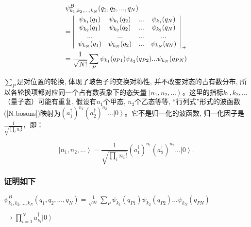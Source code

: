 \begin{equation}\label{N bosons}
\begin{gathered}
\psi_{k_1,k_2,...,k_N}^B(q_1,q_2,...,q_N) \hfill \\
= \left|
{\begin{array}{*{20}c}
   {\psi _{k_1 } (q_1 )} & {\psi _{k_1 } (q_2 )} & {...} & {\psi _{k_1 } (q_N )}  \\
   {\psi _{k_2 } (q_1 )} & {\psi _{k_2 } (q_2 )} & {...} & {\psi _{k_2 } (q_N )}  \\
   {...} & {...} & {...} & {...}  \\
   {\psi _{k_N } (q_1 )} & {\psi _{k_N } (q_2 )} & {...} & {\psi _{k_N } (q_N )}  \\
 \end{array} } \right|_ + \hfill \\
= \frac{1}{\sqrt {N!}} \sum\limits_P \psi_{k_1}(q_{P1})
\psi_{k_2}(q_{P2})...\psi_{k_N}(q_{PN}) \hfill \\
\end{gathered}
\end{equation}


$\sum\limits_P$是对位置的轮换, 体现了玻色子的交换对称性,
并不改变对态的占有数分布,
所以各轮换项都对应同一个占有数表象下的态矢量 $\left|n_1,n_2,...
\right\rangle$。这里的指标$k_1,k_2,...$（量子态）可能有重复,
假设有$n_1$个甲态, $n_2$个乙态等等, “行列式”形式的波函数(\ref{N
bosons})映射为$(a_1^{\dagger})^{n_1} (a_2^{\dagger})^{n_2}... \left|
0 \right\rangle$。它不是归一化的波函数, 归一化因子是$\frac{1}{{\sqrt
{\prod\limits_i {n_i !} } }}$，即：

\begin{equation}\label{Normalized bosons occ rep}
\left| {n_1 ,n_2 ,...} \right\rangle = \frac{1}{{\sqrt {
\prod\limits_i {n_i !} } }} (a_1^{\dagger})^{n_1}
(a_2^{\dagger})^{n_2} ... \left| 0 \right\rangle .
\end{equation}



\subsubsection*{证明如下}

\begin{center}

$\psi_{k_1,k_2,...,k_N}^B(q_1,q_2,...,q_N) = \frac{1}{\sqrt {N!}}
\sum\limits_P \psi_{k_1}(q_{P1})
\psi_{k_2}(q_{P2})...\psi_{k_N}(q_{PN})$

$\to \prod\limits_{i = 1}^N {a_{k_i }^\dag  \left| 0 \right\rangle
}$

\end{center}

